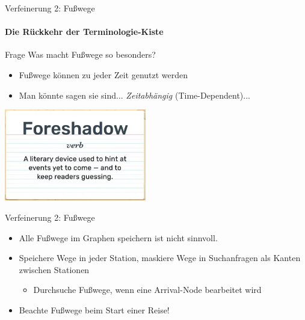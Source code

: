 \begin{frame}{Verfeinerung 2: Fußwege}
	\framesubtitle{Die Rückkehr der Terminologie-Kiste}
	\begin{block}{Frage}
		Was macht Fußwege so besonders?
	\end{block}
	\begin{itemize}
		\item Fußwege können zu jeder Zeit genutzt werden
		\item Man könnte sagen sie sind... \textit{Zeitabhängig} (Time-Dependent)...
	\end{itemize}

	\begin{center}
		\includegraphics[height=4cm]{images/foreshadowing.png} 
	\end{center}
\end{frame}


\begin{frame}{Verfeinerung 2: Fußwege}
	\begin{itemize}
		\item Alle Fußwege im Graphen speichern ist nicht sinnvoll.
		\pause
		\item Speichere Wege in jeder Station, maskiere Wege in Suchanfragen als Kanten zwischen Stationen
		\begin{itemize}
			\item Durchsuche Fußwege, wenn eine Arrival-Node bearbeitet wird 
		\end{itemize}
		\item Beachte Fußwege beim Start einer Reise!
	\end{itemize}
\end{frame}


